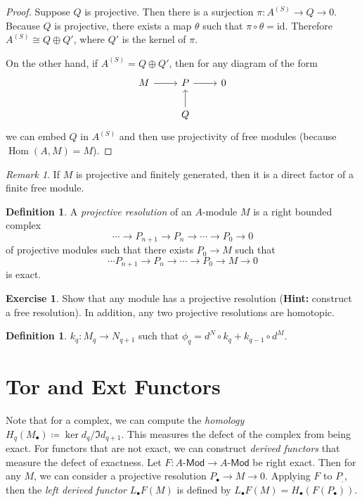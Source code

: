 \documentclass[leqno, openany]{memoir}
\theoremstyle{definition}
\newtheorem{defn}[thm]{Definition}
\newtheorem{exer}[thm]{Exercise}
\theoremstyle{remark}
\newtheorem{rmk}[thm]{Remark}
\theoremstyle{plain}
\theoremstyle{definition}
\theoremstyle{remark}
\newcommand{\mr}[1]{\mathrm{#1}}
\newcommand{\ms}[1]{\mathsf{#1}}
\DeclareMathOperator{\Hom}{Hom}
\begin{document}
\begin{proof} Suppose $Q$ is projective. Then there is a surjection $\pi:
    A^{(S)} \to Q \to 0$. Because $Q$ is projective, there exists a map
    $\theta$ such that $\pi \circ \theta = \mr{id}$. Therefore $A^{(S)} \cong Q
    \oplus Q'$, where $Q'$ is the kernel of $\pi$.

    On the other hand, if $A^{(S)} = Q \oplus Q'$, then for any diagram of the
    form \begin{equation} \begin{tikzcd} M \arrow{r} & P \arrow{r} & 0 \\ & Q
    \arrow{u} \end{tikzcd} \end{equation} we can embed $Q$ in $A^{(S)}$ and
    then use projectivity of free modules (because $\Hom(A,M) = M$).
    \end{proof}

\begin{rmk} If $M$ is projective and finitely generated, then it is a direct
factor of a finite free module.  \end{rmk}

\begin{defn} A \textit{projective resolution} of an $A$-module $M$ is a right
    bounded complex \[ \cdots \to P_{n+1} \to P_n \to \cdots \to P_0 \to 0 \]
    of projective modules such that there exists $P_0 \to M$ such that \[
    \cdots P_{n+1} \to P_n \to \cdots \to P_0 \to M \to 0 \] is exact.
\end{defn}

\begin{exer} Show that any module has a projective resolution (\textbf{Hint:}
construct a free resolution). In addition, any two projective resolutions are
homotopic.  \end{exer}

\begin{defn}
    $k_q: M_q \to N_{q+1}$ such that $\phi_q = d^N \circ k_q + k_{q-1} \circ
d^M$.  \end{defn}

\section{Tor and Ext Functors}%

Note that for a complex, we can compute the \textit{homology} $H_q(M_{\bullet})
\coloneqq \ker d_q / \Im d_{q+1}$.  This measures the defect of the complex
from being exact.  For functors that are not exact, we can construct
\textit{derived functors} that measure the defect of exactness.  Let $F:
A\text{-}\ms{Mod} \to A\text{-}\ms{Mod}$ be right exact.  Then for any $M$, we
can consider a projective resolution $P_{\bullet} \to M \to 0$.  Applying $F$
to $P_{.}$, then the \textit{left derived functor} $L_{\bullet} F(M)$ is
defined by $L_{\bullet} F(M) = H_{\bullet}(F(P_{\bullet}))$.
\end{document}
